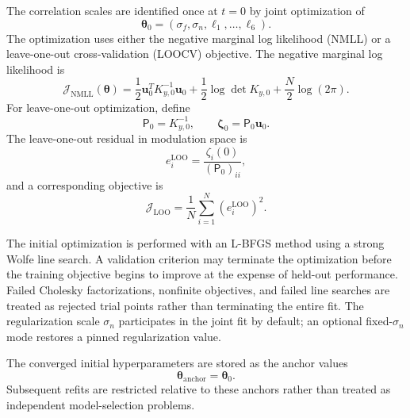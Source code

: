 \documentclass[
  11pt,
  letterpaper,
  onehalfspacing,
  normalmargins,
  equalmargins,
  oneside
]{ut-thesis}
\begin{document}
The correlation scales are identified once at \(t=0\) by joint optimization
of
\begin{equation}
\boldsymbol\theta_0
=
\left(
\sigma_f,
\sigma_n,
\ell_1,\ldots,\ell_6
\right).
\label{eq:gp-initial-hyperparameters}
\end{equation}
The optimization uses either the negative marginal log likelihood (NMLL) or a
leave-one-out cross-validation (LOOCV) objective. The negative marginal log
likelihood is
\begin{equation}
\mathcal J_{\mathrm{NMLL}}(\boldsymbol\theta)
=
\frac{1}{2}
\mathbf u_0^T K_{y,0}^{-1}\mathbf u_0
+
\frac{1}{2}\log\det K_{y,0}
+
\frac{N}{2}\log(2\pi).
\label{eq:gp-nmll-objective}
\end{equation}
For leave-one-out optimization, define
\begin{equation}
\mathsf P_0=K_{y,0}^{-1},
\qquad
\boldsymbol\zeta_0=\mathsf P_0\mathbf u_0.
\label{eq:gp-loo-inverse-coefficients}
\end{equation}
The leave-one-out residual in modulation space is
\begin{equation}
 e_i^{\mathrm{LOO}}
=
\frac{\zeta_i(0)}{(\mathsf P_0)_{ii}},
\label{eq:gp-loo-residual}
\end{equation}
and a corresponding objective is
\begin{equation}
\mathcal J_{\mathrm{LOO}}
=
\frac{1}{N}
\sum_{i=1}^{N}
\left(e_i^{\mathrm{LOO}}\right)^2.
\label{eq:gp-loo-objective}
\end{equation}

The initial optimization is performed with an L-BFGS method using a strong
Wolfe line search. A validation criterion may terminate the optimization
before the training objective begins to improve at the expense of held-out
performance. Failed Cholesky factorizations, nonfinite objectives, and failed
line searches are treated as rejected trial points rather than terminating
the entire fit. The regularization scale \(\sigma_n\) participates in the
joint fit by default; an optional fixed-\(\sigma_n\) mode restores a pinned
regularization value.

The converged initial hyperparameters are stored as the anchor values
\begin{equation}
\boldsymbol\theta_{\mathrm{anchor}}
=
\boldsymbol\theta_0.
\label{eq:gp-hyperparameter-anchors}
\end{equation}
Subsequent refits are restricted relative to these anchors rather than treated
as independent model-selection problems.
\end{document}
